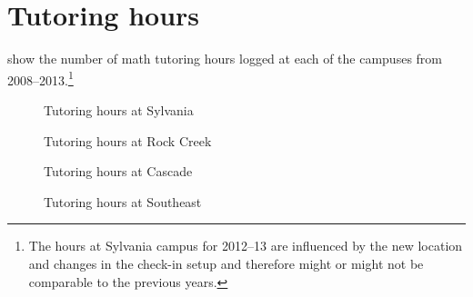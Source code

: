 \chapter{Tutoring hours}\label{app:sec:tutoringhours}
 show
the number of math tutoring hours logged at each of the campuses from 2008--2013.\footnote{The hours at Sylvania campus for 2012--13 are influenced by the new location and changes in the check-in setup and therefore might or might not be comparable to the previous years.}

\begin{figure}[!htb]
	\captionsetup{skip=0pt}
	\begin{widepage}
	\hfill
	\begin{minipage}{.35\textwidth}
		\centering
		
		\caption{Tutoring hours at Sylvania}
		\label{app:fig:tutoringsylvania}
	\end{minipage}%
	\hfill
	\begin{minipage}{.35\textwidth}
		\centering
		
		\caption{Tutoring hours at Rock Creek}
		\label{app:fig:tutoringrockcreek}
	\end{minipage}%
	\end{widepage}
\end{figure}

\begin{figure}[!htb]
	\captionsetup{skip=0pt}
	\begin{widepage}
	\hfill
	\begin{minipage}{.35\textwidth}
		\centering
		
		\caption{Tutoring hours at Cascade}
		\label{app:fig:tutoringCascade}
	\end{minipage}%
	\hfill
	\begin{minipage}{.35\textwidth}
		\centering
		
		\caption{Tutoring hours at Southeast}
		\label{app:fig:tutoringsoutheast}
	\end{minipage}%
	\end{widepage}
\end{figure}

\afterpage{\global\pdfpageattr\expandafter{\the\pdfpageattr/Rotate 90}}

